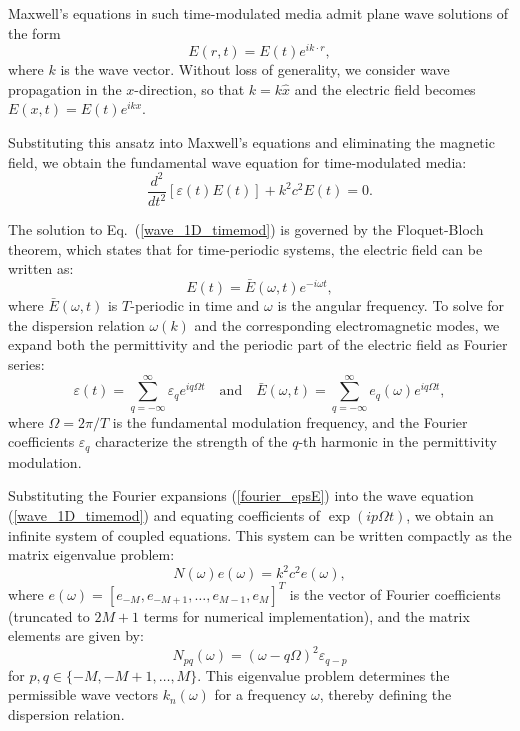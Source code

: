 \documentclass[%
 reprint,
 amsmath,amssymb,
 aps,
 prb,
]{revtex4-2}
\begin{document}
Maxwell's equations in such time-modulated media admit plane wave solutions of the form
\begin{equation}
{E}({r}, t) = {E}(t) e^{i{k} \cdot {r}},
\end{equation}
where ${k}$ is the wave vector. Without loss of generality, we consider wave propagation in the $x$-direction, so that ${k} = k \hat{{x}}$ and the electric field becomes $E(x, t) = E(t) e^{ikx}$.

Substituting this ansatz into Maxwell's equations and eliminating the magnetic field, we obtain the fundamental wave equation for time-modulated media:
\begin{equation}
\frac{d^{2}}{d t^{2}}[\varepsilon(t) E(t)] + k^{2} c^{2} E(t) = 0. \label{wave_1D_timemod}
\end{equation}

The solution to Eq.~(\ref{wave_1D_timemod}) is governed by the Floquet-Bloch theorem, which states that for time-periodic systems, the electric field can be written as:
\begin{equation}
E(t) = \bar{E}(\omega, t) e^{-i\omega t}, \label{floquet_form}
\end{equation}
where $\bar{E}(\omega, t)$ is $T$-periodic in time and $\omega$ is the angular frequency.
To solve for the dispersion relation $\omega(k)$ and the corresponding electromagnetic modes, we expand both the permittivity and the periodic part of the electric field as Fourier series:
\begin{equation}
\varepsilon(t) = \sum_{q=-\infty}^{\infty} \varepsilon_{q} e^{iq\Omega t}\quad \text{and}
\quad \bar{E}(\omega, t) = \sum_{q=-\infty}^{\infty} e_{q}(\omega) e^{iq\Omega t}, \label{fourier_epsE}
\end{equation}
where $\Omega = 2\pi/T$ is the fundamental modulation frequency, and the Fourier coefficients $\varepsilon_q$ characterize the strength of the $q$-th harmonic in the permittivity modulation.


Substituting the Fourier expansions (\ref{fourier_epsE}) into the wave equation (\ref{wave_1D_timemod}) and equating coefficients of $\exp({ip\Omega t})$, we obtain an infinite system of coupled equations. This system can be written compactly as the matrix eigenvalue problem:
\begin{equation}
{N}(\omega) {e}(\omega) = k^{2} c^{2} {e}(\omega), \label{eq:mat_eig}
\end{equation}
where ${e}(\omega) = [e_{-M}, e_{-M+1}, \ldots, e_{M-1}, e_M]^T$ is the vector of Fourier coefficients (truncated to $2M+1$ terms for numerical implementation), and the matrix elements are given by:
\begin{equation}
N_{pq}(\omega) = (\omega - q\Omega)^{2} \varepsilon_{q-p}  \label{matrix_elements}
\end{equation}
for $p,q \in \{-M, -M+1, \ldots, M\}$.
This eigenvalue problem determines the permissible wave vectors $k_n(\omega)$ for a frequency $\omega$, thereby defining the dispersion relation.
\end{document}
